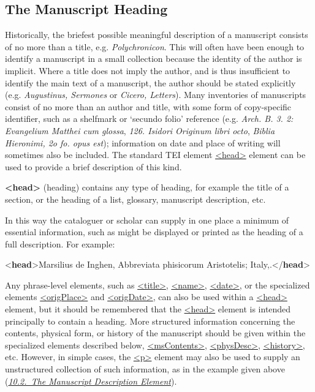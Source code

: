 \subsection[{The Manuscript Heading}]{The Manuscript Heading}\label{msdo}\par
Historically, the briefest possible meaningful description of a manuscript consists of no more than a title, e.g. \textit{Polychronicon}. This will often have been enough to identify a manuscript in a small collection because the identity of the author is implicit. Where a title does not imply the author, and is thus insufficient to identify the main text of a manuscript, the author should be stated explicitly (e.g. \textit{Augustinus, Sermones} or \textit{Cicero, Letters}). Many inventories of manuscripts consist of no more than an author and title, with some form of copy-specific identifier, such as a shelfmark or ‘secundo folio’ reference (e.g. \textit{Arch. B. 3. 2: Evangelium Matthei cum glossa}, \textit{126. Isidori Originum libri octo}, \textit{Biblia Hieronimi, 2o fo. opus est}); information on date and place of writing will sometimes also be included. The standard TEI element \hyperref[TEI.head]{<head>} element can be used to provide a brief description of this kind. 
\begin{sansreflist}
  
\item [\textbf{<head>}] (heading) contains any type of heading, for example the title of a section, or the heading of a list, glossary, manuscript description, etc.
\end{sansreflist}
 In this way the cataloguer or scholar can supply in one place a minimum of essential information, such as might be displayed or printed as the heading of a full description. For example: \par\bgroup{}\exampleFont \begin{shaded}\noindent\mbox{}{<\textbf{head}>}Marsilius de Inghen, Abbreviata phisicorum Aristotelis; Italy,\mbox{}.{</\textbf{head}>}\end{shaded}\egroup\par \noindent  Any phrase-level elements, such as \hyperref[TEI.title]{<title>}, \hyperref[TEI.name]{<name>}, \hyperref[TEI.date]{<date>}, or the specialized elements \hyperref[TEI.origPlace]{<origPlace>} and \hyperref[TEI.origDate]{<origDate>}, can also be used within a \hyperref[TEI.head]{<head>} element, but it should be remembered that the \hyperref[TEI.head]{<head>} element is intended principally to contain a heading. More structured information concerning the contents, physical form, or history of the manuscript should be given within the specialized elements described below, \hyperref[TEI.msContents]{<msContents>}, \hyperref[TEI.physDesc]{<physDesc>}, \hyperref[TEI.history]{<history>}, etc. However, in simple cases, the \hyperref[TEI.p]{<p>} element may also be used to supply an unstructured collection of such information, as in the example given above (\textit{\hyperref[msdesc]{10.2.\ The Manuscript Description Element}}).
